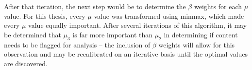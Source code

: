 \documentclass[preprint,review,12pt]{elsarticle}
\begin{document}
After that iteration, the next step would be to determine the $\beta$ weights for each $\mu$ value. For this thesis, every $\mu$ value was transformed using minmax, which made every $\mu$ value equally important. After several iterations of this algorithm, it may be determined that $\mu_3$ is far more important than $\mu_2$ in determining if content needs to be flagged for analysis -- the inclusion of $\beta$ weights will allow for this observation and may be recalibrated on an iterative basis until the optimal values are discovered.



\newpage
 

\end{document}
